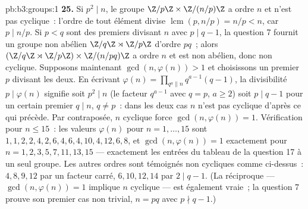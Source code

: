 \begin{solution}{pb:b3:groups:1}
\textbf{25.} Si $p^2 \mid n$, le groupe $\Z/p\Z \times
\Z/(n/p)\Z$ a ordre $n$ et n'est pas cyclique~: l'ordre de tout
élément divise $\operatorname{lcm}(p, n/p) = n/p < n$, car $p
\mid n/p$. Si $p < q$ sont des premiers divisant $n$ avec $p
\mid q - 1$, la question 7 fournit un groupe non abélien
$\Z/q\Z \rtimes \Z/p\Z$ d'ordre $pq$~; alors $(\Z/q\Z \rtimes
\Z/p\Z) \times \Z/(n/pq)\Z$ a ordre $n$ et est non abélien, donc
non cyclique. Supposons maintenant $\gcd(n, \varphi(n)) > 1$ et
choisissons un premier $p$ divisant les deux. En écrivant
$\varphi(n) = \prod_{q^a \parallel n} q^{a-1}(q - 1)$, la
divisibilité $p \mid \varphi(n)$ signifie soit $p^2 \mid n$ (le
facteur $q^{a-1}$ avec $q = p$, $a \geq 2$) soit $p \mid q - 1$
pour un certain premier $q \mid n$, $q \neq p$~: dans les deux
cas $n$ n'est pas cyclique d'après ce qui précède. Par
contraposée, $n$ cyclique force $\gcd(n, \varphi(n)) = 1$.
Vérification pour $n \leq 15$~: les valeurs $\varphi(n)$ pour $n
= 1, \dots, 15$ sont $1, 1, 2, 2, 4, 2, 6, 4, 6, 4, 10, 4, 12,
6, 8$, et $\gcd(n, \varphi(n)) = 1$ exactement pour $n = 1, 2,
3, 5, 7, 11, 13, 15$ --- exactement les entrées du tableau de
la question 17 à un seul groupe. Les autres ordres sont
témoignés non cycliques comme ci-dessus~: $4, 8, 9, 12$ par un
facteur carré, $6, 10, 12, 14$ par $2 \mid q - 1$. (La
réciproque --- $\gcd(n, \varphi(n)) = 1$ implique $n$ cyclique
--- est également vraie~; la question 7 prouve son premier cas
non trivial, $n = pq$ avec $p \nmid q - 1$.)
\end{solution}
